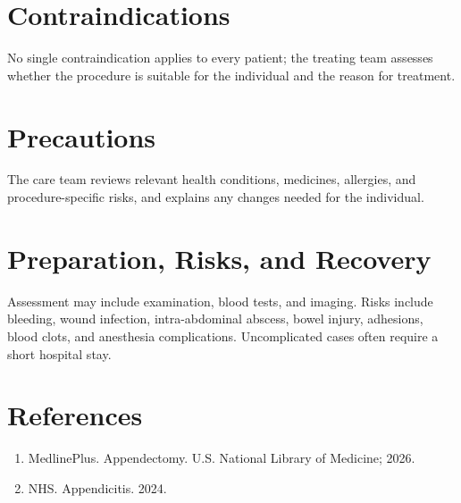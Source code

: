 \section*{Contraindications}
No single contraindication applies to every patient; the treating team assesses whether the procedure is suitable for the individual and the reason for treatment.

\section*{Precautions}
The care team reviews relevant health conditions, medicines, allergies, and procedure-specific risks, and explains any changes needed for the individual.

\section*{Preparation, Risks, and Recovery}
Assessment may include examination, blood tests, and imaging. Risks include bleeding, wound infection, intra-abdominal abscess, bowel injury, adhesions, blood clots, and anesthesia complications. Uncomplicated cases often require a short hospital stay.

\section*{References}
\begin{enumerate}
  \item MedlinePlus. Appendectomy. U.S. National Library of Medicine; 2026.
  \item NHS. Appendicitis. 2024.
\end{enumerate}

\clearpage
